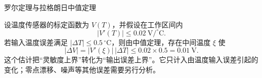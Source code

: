 \documentclass[aspectratio=169,10pt,fontset=fandol]{ctexbeamer}
\begin{document}
\begin{frame}[t,fragile]{罗尔定理与拉格朗日中值定理}
\normalsize
{\normalsize
\begin{application}[工程：传感器误差上界]
设温度传感器的标定函数为 $V(T)$，并假设在工作区间内
\[
|V'(T)|\leq0.02\ \mathrm{V/^{\circ}C}.
\]
若输入温度误差满足 $|\Delta T|\leq0.5\,^{\circ}\mathrm C$，则由中值定理，存在中间温度 $\xi$ 使
\[
|\Delta V|=|V'(\xi)|\,|\Delta T|
\leq0.02\times0.5
=0.01\ \mathrm V.
\]
这个估计把“灵敏度上界”转化为“输出误差上界”。它只计入由温度输入误差引起的变化；零点漂移、噪声等其他误差需要另行分析。
\end{application}
}
\end{frame}
\end{document}
